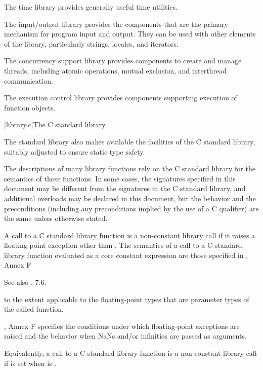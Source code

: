 \pnum
The time library provides
generally useful time utilities.

\pnum
The input/output library provides the
components that are the primary mechanism for \Cpp{} program input and output.
They can be used with other elements of the library, particularly
strings, locales, and iterators.

\pnum
The concurrency support library provides components to create
and manage threads,
including atomic operations, mutual exclusion, and interthread communication.

\pnum
The execution control library provides components
supporting execution of function objects.

[library.c]{The C standard library}

\pnum
The \Cpp{} standard library also makes available the facilities of the C standard library,
%
suitably adjusted to ensure static type safety.

\pnum
The descriptions of many library functions rely on the C standard library for
the semantics of those functions.
In some cases,
the signatures specified in this document
may be different from the signatures in the C standard library,
and additional overloads may be declared in this document,
but the behavior and the preconditions
(including any preconditions implied by the use of
a C  qualifier)
are the same unless otherwise stated.

\pnum
A call to a C standard library function is
a non-constant library call
if it raises a floating-point exception other than .
The semantics of a call to a C standard library function
evaluated as a core constant expression
are those specified in \IsoC{}, Annex F
\begin{footnote}
See also \IsoC{}, 7.6.
\end{footnote}
to the extent applicable to the floating-point types
that are parameter types of the called function.
\begin{note}
\IsoC{}, Annex F specifies
the conditions under which floating-point exceptions are raised and
the behavior when NaNs and/or infinities are passed as arguments.
\end{note}
\begin{note}
Equivalently, a call to a C standard library function is
a non-constant library call
if  is set
when  is .
\end{note}

